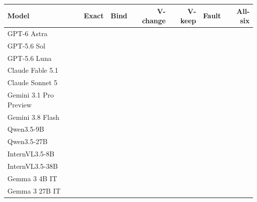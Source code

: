 \begin{tabular}{@{}lrrrrrr@{}}
\toprule
Model & Exact & Bind & V-change & V-keep & Fault & All-six\\
\midrule
GPT-6 Astra &  &  &  &  &  & \\
GPT-5.6 Sol &  &  &  &  &  & \\
GPT-5.6 Luna &  &  &  &  &  & \\
Claude Fable 5.1 &  &  &  &  &  & \\
Claude Sonnet 5 &  &  &  &  &  & \\
Gemini 3.1 Pro Preview &  &  &  &  &  & \\
Gemini 3.8 Flash &  &  &  &  &  & \\
Qwen3.5-9B &  &  &  &  &  & \\
Qwen3.5-27B &  &  &  &  &  & \\
InternVL3.5-8B &  &  &  &  &  & \\
InternVL3.5-38B &  &  &  &  &  & \\
Gemma 3 4B IT &  &  &  &  &  & \\
Gemma 3 27B IT &  &  &  &  &  & \\
\bottomrule
\end{tabular}

